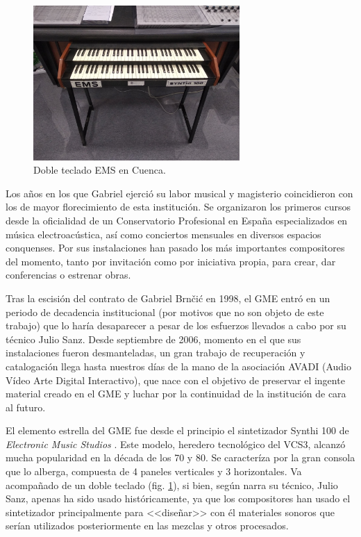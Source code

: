 \begin{figure}
	\centering
	\includegraphics[width=0.7\textwidth]{teclado_EMS}
	\caption[Doble teclado EMS en Cuenca.]{Doble teclado EMS en Cuenca.}
	\label{fig:teclado_EMS}
\end{figure}

Los años en los que Gabriel ejerció su labor musical y magisterio coincidieron con los de mayor florecimiento de esta institución. Se organizaron los primeros cursos desde la oficialidad de un Conservatorio Profesional en España especializados en música electroacústica, así como conciertos mensuales en diversos espacios conquenses. Por sus instalaciones han pasado los más importantes compositores del momento, tanto por invitación como por iniciativa propia, para crear, dar conferencias o estrenar obras.

Tras la escisión del contrato de Gabriel Brnčić en 1998, el GME entró en un periodo de decadencia institucional (por motivos que no son objeto de este trabajo) que lo haría desaparecer a pesar de los esfuerzos llevados a cabo por su técnico Julio Sanz. Desde septiembre de 2006, momento en el que sus instalaciones fueron desmanteladas, un gran trabajo de recuperación y catalogación llega hasta nuestros días de la mano de la asociación AVADI (Audio Vídeo Arte Digital Interactivo), que nace con el objetivo de preservar el ingente material creado en el GME y luchar por la continuidad de la institución de cara al futuro. 

El elemento estrella del GME fue desde el principio el sintetizador Synthi 100 de\textit{ Electronic Music Studios} \citeyear{ems}. Este modelo, heredero tecnológico del VCS3, alcanzó mucha popularidad en la década de los 70 y 80. Se caracteríza por la gran consola que lo alberga, compuesta de 4 paneles verticales y 3 horizontales. Va acompañado de un doble teclado (fig. \ref{fig:teclado_EMS}), si bien, según narra su técnico, Julio Sanz, apenas ha sido usado históricamente, ya que los compositores han usado el sintetizador principalmente para <<diseñar>> con él materiales sonoros que serían utilizados posteriormente en las mezclas y otros procesados.

